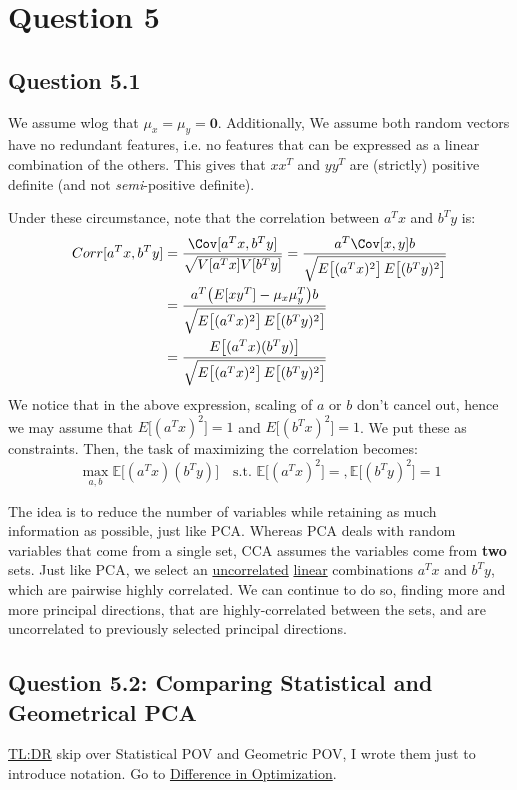 \documentclass{article}
\begin{document}
\section*{Question 5}
\subsection*{Question 5.1}
We assume wlog that $\mu_{x} = \mu_{y} = \bm{0}$. Additionally, We assume both random vectors have no redundant features, i.e. no features that can be expressed as a linear combination of the others. This gives that $xx^{T}$ and $yy^{T}$ are (strictly) positive definite (and not \textit{semi}-positive definite). 


Under these circumstance, note that   the correlation between $a^{T}x$ and $b^{T}y$ is:
\begin{align*}
  Corr[a^{T}x, b^{T}y] &= \frac{\Cov[a^{T}x, b^{T}y]}{\sqrt{ V[a^{T}x] V[b^{T}y]}}  = \frac{a^{T} \Cov[x,y] b}{\sqrt{ E\big[(a^{T}x)^2 \big] \, E \big[(b^{T}y)^2 \big] }} \\
  &=  \frac{a^{T} \big( E[xy^{T}] - \mu_{x} \mu_{y}^{T} \big) b}{\sqrt{ E\big[(a^{T}x)^2 \big] \, E \big[(b^{T}y)^2 \big] }} \\
  &=  \frac{ E \big[(a^{T}x)(b^{T}y)  \big] }{\sqrt{ E\big[(a^{T}x)^2 \big] \, E \big[(b^{T}y)^2 \big] }}
\end{align*}
We notice that in the above expression, scaling of $a$ or $b$ don't cancel out, hence we may assume that $E \big[ (a^{T}x) ^2 \big] = 1$ and $E \big[ (b^{T}x) ^2  \big] = 1$. We put these as constraints. Then, the task of maximizing the correlation becomes:
\[
  \max_{a,b} \mathbb{E} \Big[ (a^{T}x)(b^{T}y) \Big] \quad \text{s.t. } \mathbb{E} \big[(a^{T}x)^2 \big] =, \mathbb{E} \big[(b^{T}y)^2  \big] = 1
\]

The idea is to reduce the number of variables while retaining as much information as possible, just like PCA. 
Whereas PCA deals with random variables that come from a single set, CCA assumes the variables come from \textbf{two} sets. Just like PCA, we select an \ul{uncorrelated} \ul{linear} combinations $a^{T}x$ and $b^{T}y$, which are pairwise highly correlated. We can continue to do so, finding more and more principal directions, that are highly-correlated between the sets, and are uncorrelated to previously selected principal directions. 


\subsection*{Question 5.2: Comparing Statistical and Geometrical PCA}
\ul{TL:DR} skip over Statistical POV and Geometric POV, I wrote them just to introduce notation. Go to \ul{Difference in Optimization}. 
\end{document}
